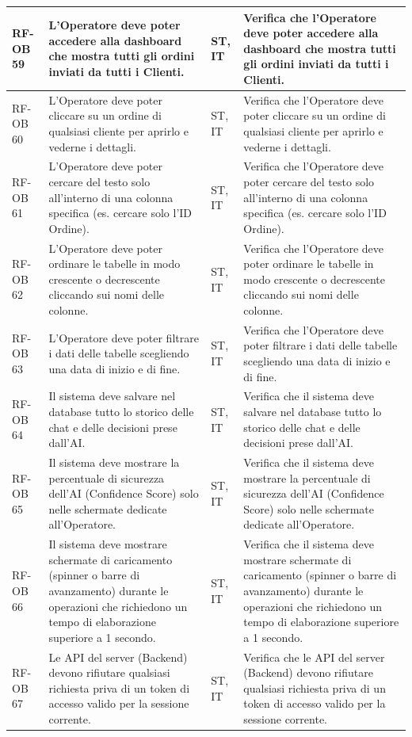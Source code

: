 \documentclass[a4paper,11pt,oneside]{scrartcl}
\begin{document}
\begin{longtable}{|p{1.5cm}|p{4.5cm}|p{1.8cm}|p{6cm}|}
RF-OB 59 & L'Operatore deve poter accedere alla dashboard che mostra tutti gli ordini inviati da tutti i Clienti. & ST, IT & Verifica che l'Operatore deve poter accedere alla dashboard che mostra tutti gli ordini inviati da tutti i Clienti. \\ \hline
RF-OB 60 & L'Operatore deve poter cliccare su un ordine di qualsiasi cliente per aprirlo e vederne i dettagli. & ST, IT & Verifica che l'Operatore deve poter cliccare su un ordine di qualsiasi cliente per aprirlo e vederne i dettagli. \\ \hline
RF-OB 61 & L'Operatore deve poter cercare del testo solo all'interno di una colonna specifica (es. cercare solo l'ID Ordine). & ST, IT & Verifica che l'Operatore deve poter cercare del testo solo all'interno di una colonna specifica (es. cercare solo l'ID Ordine). \\ \hline
RF-OB 62 & L'Operatore deve poter ordinare le tabelle in modo crescente o decrescente cliccando sui nomi delle colonne. & ST, IT & Verifica che l'Operatore deve poter ordinare le tabelle in modo crescente o decrescente cliccando sui nomi delle colonne. \\ \hline
RF-OB 63 & L'Operatore deve poter filtrare i dati delle tabelle scegliendo una data di inizio e di fine. & ST, IT & Verifica che l'Operatore deve poter filtrare i dati delle tabelle scegliendo una data di inizio e di fine. \\ \hline
RF-OB 64 & Il sistema deve salvare nel database tutto lo storico delle chat e delle decisioni prese dall'AI. & ST, IT & Verifica che il sistema deve salvare nel database tutto lo storico delle chat e delle decisioni prese dall'AI. \\ \hline
RF-OB 65 & Il sistema deve mostrare la percentuale di sicurezza dell'AI (Confidence Score) solo nelle schermate dedicate all'Operatore. & ST, IT & Verifica che il sistema deve mostrare la percentuale di sicurezza dell'AI (Confidence Score) solo nelle schermate dedicate all'Operatore. \\ \hline
RF-OB 66 & Il sistema deve mostrare schermate di caricamento (spinner o barre di avanzamento) durante le operazioni che richiedono un tempo di elaborazione superiore a 1 secondo. & ST, IT & Verifica che il sistema deve mostrare schermate di caricamento (spinner o barre di avanzamento) durante le operazioni che richiedono un tempo di elaborazione superiore a 1 secondo. \\ \hline
RF-OB 67 & Le API del server (Backend) devono rifiutare qualsiasi richiesta priva di un token di accesso valido per la sessione corrente. & ST, IT & Verifica che le API del server (Backend) devono rifiutare qualsiasi richiesta priva di un token di accesso valido per la sessione corrente. \\ \hline

\end{longtable}
\end{document}
